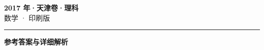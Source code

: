 \documentclass[zihao=5, a4paper]{ctexart}
\begin{document}
\begin{center}
  {\Large\bfseries 2017 年·天津卷·理科}\\[4pt]
  {\large 数学 · 印刷版}
\end{center}
\medskip
{}

\par\bigskip\hrule\bigskip
{}
\begin{center}{\large\bfseries 参考答案与详细解析}\end{center}
\smallskip

\end{document}
